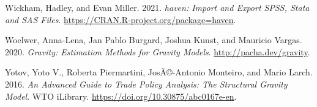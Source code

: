 \documentclass[12pt]{article}
\newlength{\cslhangindent}
\newenvironment{CSLReferences}[2] %
 {\begin{list}{}{%
  \setlength{\itemindent}{0pt}
  \setlength{\leftmargin}{0pt}
  \setlength{\parsep}{0pt}
  \ifodd #1
   \setlength{\leftmargin}{\cslhangindent}
   \setlength{\itemindent}{-1\cslhangindent}
  \fi
  \setlength{\itemsep}{#2\baselineskip}}}
 {\end{list}}
\begin{document}
\begin{CSLReferences}{1}{0}
Wickham, Hadley, and Evan Miller. 2021. \emph{{haven: Import and Export
SPSS, Stata and SAS Files}}.
\url{https://CRAN.R-project.org/package=haven}.

Woelwer, Anna-Lena, Jan Pablo Burgard, Joshua Kunst, and Mauricio
Vargas. 2020. \emph{Gravity: Estimation Methods for Gravity Models}.
\url{http://pacha.dev/gravity}.

Yotov, Yoto V., Roberta Piermartini, JosÃ©-Antonio Monteiro, and Mario
Larch. 2016. \emph{An {Advanced} {Guide} to {Trade} {Policy}
{Analysis}\hspace{0pt}: {The} {Structural} {Gravity} {Model}}. WTO
iLibrary. \url{https://doi.org/10.30875/abc0167e-en}.

\end{CSLReferences}

\end{document}
